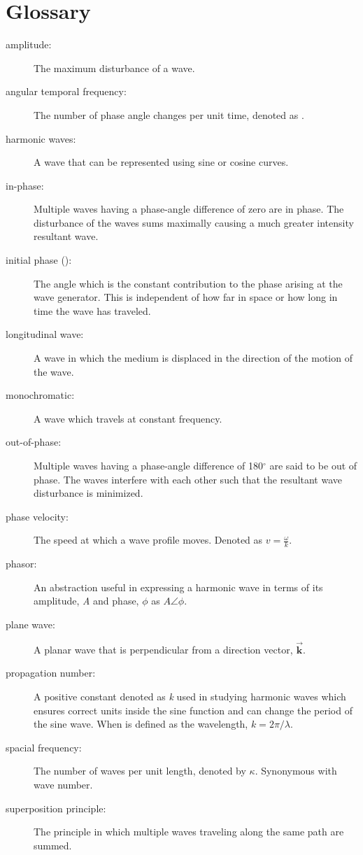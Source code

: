 \documentclass[12pt]{report}
\begin{document}
\section{Glossary}
\begin{description}
\item[amplitude:] The maximum disturbance of a wave.
\item[angular temporal frequency:] The number of phase angle changes per unit time, denoted as \textomega .
\item[harmonic waves:] A wave that can be represented using sine or cosine curves. 
\item[in-phase:] Multiple waves having a phase-angle difference of zero are in phase. The disturbance of the waves sums maximally causing a much greater intensity resultant wave.
\item[initial phase (\textepsilon ):] The angle which is the constant contribution to the phase arising at the wave generator. This is independent of how far in space or how long in time the wave has traveled. 
\item[longitudinal wave:] A wave in which the  medium is displaced in the direction of the motion of the wave.
\item[monochromatic:] A wave which travels at constant frequency.
\item[out-of-phase:] Multiple waves having a phase-angle difference of 180$^{\circ}$ are said to be out of phase. The waves interfere with each other such that the resultant wave disturbance is minimized. 
\item[phase velocity:] The speed at which a wave profile moves. Denoted as $v = \frac{\omega}{k}$.
\item[phasor:] An abstraction useful in expressing a harmonic wave in terms of its amplitude, \emph{A} and phase, $\phi$ as $A \angle \phi$. 
\item[plane wave:] A planar wave that is perpendicular from a direction vector, $\mathbf{\vec{k}}$.
\item[propagation number:] A positive constant denoted as \emph{k} used in studying harmonic waves which ensures correct units inside the sine function and can change the period of the sine wave. When \textlambda  is defined as the wavelength, $k=2\pi /\lambda$.
\item[spacial frequency:] The number of waves per unit length, denoted by $\kappa$. Synonymous with wave number. 
\item[superposition principle:] The principle in which multiple waves traveling along the same path are summed. 

\end{description}
\end{document}
